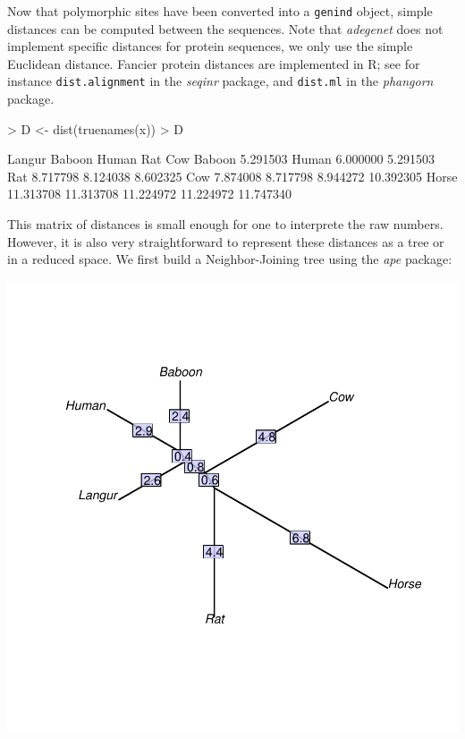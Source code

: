 \documentclass{article}
\begin{document}
Now that polymorphic sites have been converted into a \texttt{genind} object, simple distances can be
computed between the sequences.
Note that \textit{adegenet} does not implement specific distances for protein sequences, we only use the
simple Euclidean distance.
Fancier protein distances are implemented in R; see for instance \texttt{dist.alignment} in the
\emph{seqinr} package, and \texttt{dist.ml} in the \emph{phangorn} package.

\begin{Schunk}
\begin{Sinput}
> D <- dist(truenames(x))
> D
\end{Sinput}
\begin{Soutput}
          Langur    Baboon     Human       Rat       Cow
Baboon  5.291503                                        
Human   6.000000  5.291503                              
Rat     8.717798  8.124038  8.602325                    
Cow     7.874008  8.717798  8.944272 10.392305          
Horse  11.313708 11.313708 11.224972 11.224972 11.747340
\end{Soutput}
\end{Schunk}
This matrix of distances is small enough for one to interprete the raw numbers.
However, it is also very straightforward to represent these distances as a tree or in a reduced space.
We first build a Neighbor-Joining tree using the \emph{ape} package:
\begin{Schunk}
\end{Schunk}
\includegraphics{figs/base-njAA}
\end{document}
